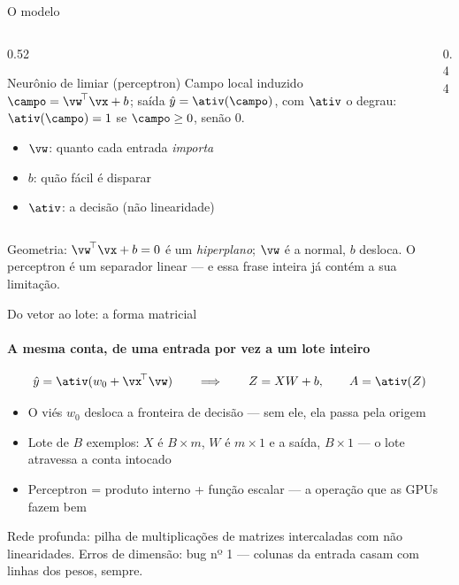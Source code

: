 \documentclass[aspectratio=169, 11pt]{beamer}
\begin{document}
\begin{frame}{O modelo}
  \begin{columns}[T]
    \begin{column}{0.52\textwidth}
      \begin{defbox}{Neurônio de limiar (perceptron)}
        Campo local induzido \(\campo = \vw^{\!\top}\vx + b\); saída
        \(\hat{y} = \ativ(\campo)\), com \(\ativ\) o degrau:
        \(\ativ(\campo) = 1\) se \(\campo \ge 0\), senão \(0\).
      \end{defbox}
      \begin{itemize}\setlength{\itemsep}{0.2ex}
        \item $\vw$: quanto cada entrada \emph{importa}
        \item $b$: quão fácil é disparar
        \item $\ativ$: a decisão (não linearidade)
      \end{itemize}
    \end{column}
    \begin{column}{0.44\textwidth}
      \begin{center}
        \scalebox{0.72}{\perceptron}
      \end{center}
    \end{column}
  \end{columns}

  \begin{ideiabox}
    Geometria: \(\vw^{\!\top}\vx + b = 0\) é um \emph{hiperplano}; $\vw$ é a
    normal, $b$ desloca. O perceptron é um separador linear — e essa frase
    inteira já contém a sua limitação.
  \end{ideiabox}
\end{frame}

\begin{frame}{Do vetor ao lote: a forma matricial}
  \framesubtitle{A mesma conta, de uma entrada por vez a um lote inteiro}

  \[
    \hat{y} = \ativ(w_0 + \vx^{\!\top}\vw)
    \qquad\Longrightarrow\qquad
    Z = XW + b, \qquad A = \ativ(Z)
  \]

  \begin{itemize}\setlength{\itemsep}{0.35ex}
    \item O viés $w_0$ desloca a fronteira de decisão — sem ele, ela passa
          pela origem
    \item Lote de $B$ exemplos: $X$ é $B{\times}m$, $W$ é $m{\times}1$ e a
          saída, $B{\times}1$ — o lote atravessa a conta intocado
    \item Perceptron = produto interno + função escalar — a operação que as
          GPUs fazem bem
  \end{itemize}

  \begin{ideiabox}
    Rede profunda: pilha de multiplicações de matrizes intercaladas com não
    linearidades. Erros de dimensão: bug nº 1 — colunas da entrada casam com
    linhas dos pesos, sempre.
  \end{ideiabox}
\end{frame}
\end{document}
